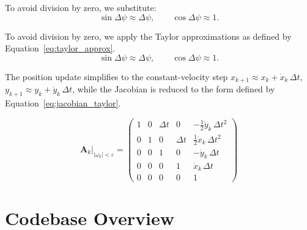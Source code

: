 To avoid division by zero, we substitute:
\begin{equation}
    \sin\Delta\psi \approx \Delta\psi, \qquad
    \cos\Delta\psi \approx 1.
\end{equation}

To avoid division by zero, we apply the Taylor approximations as defined by Equation~\ref{eq:taylor_approx}.
\begin{equation}
    \sin\Delta\psi \approx \Delta\psi, \qquad \cos\Delta\psi \approx 1.
    \label{eq:taylor_approx}
\end{equation}

The position update simplifies to the constant-velocity step
$x_{k+1} \approx x_k + \dot{x}_k\,\Delta t$, $y_{k+1} \approx y_k + \dot{y}_k\,\Delta t$,
while the Jacobian is reduced to the form defined by Equation~\ref{eq:jacobian_taylor}.


\begin{equation}
    \mathbf{A}_k\big|_{|\omega_k|<\varepsilon} =
    \begin{pmatrix}
        1 & 0 & \Delta t & 0 & -\tfrac{1}{2}\dot{y}_k\,\Delta t^2 \\
        0 & 1 & 0 & \Delta t &  \tfrac{1}{2}\dot{x}_k\,\Delta t^2 \\
        0 & 0 & 1 & 0 & -\dot{y}_k\,\Delta t \\
        0 & 0 & 0 & 1 &  \dot{x}_k\,\Delta t \\
        0 & 0 & 0 & 0 & 1
    \end{pmatrix}
    \label{eq:jacobian_taylor}
\end{equation}


\chapter{Codebase Overview} 
\label{chap:appendixcodebase}


